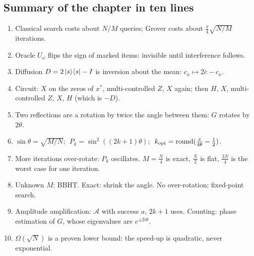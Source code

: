 \documentclass[11pt,a4paper,openany]{book}
\newcommand{\kopt}{k_{\rm opt}}
\newcommand{\xs}{x^\ast}
\newcommand{\proj}[1]{\ket{#1}\!\bra{#1}}
\begin{document}
\subsection*{Summary of the chapter in ten lines}
\begin{enumerate}[itemsep=1pt]
\item Classical search costs about $N/M$ queries; Grover costs about $\frac\pi4\sqrt{N/M}$ iterations.
\item Oracle $U_\omega$ flips the sign of marked items: invisible until interference follows.
\item Diffusion $D = 2\proj{s} - I$ is inversion about the mean: $c_x \mapsto 2\bar c - c_x$.
\item Circuit: $X$ on the zeros of $\xs$, multi-controlled $Z$, $X$ again; then $H$, $X$, multi-controlled $Z$, $X$, $H$ (which is $-D$).
\item Two reflections are a rotation by twice the angle between them: $G$ rotates by $2\theta$.
\item $\sin\theta = \sqrt{M/N}$; $\;P_k = \sin^2((2k+1)\theta)$; $\;\kopt = \operatorname{round}(\frac{\pi}{4\theta} - \frac12)$.
\item More iterations over-rotate: $P_k$ oscillates. $M = \frac N4$ is exact, $\frac N2$ is flat, $\frac{3N}{4}$ is the worst case for one iteration.
\item Unknown $M$: BBHT. Exact: shrink the angle. No over-rotation: fixed-point search.
\item Amplitude amplification: $\mathcal{A}$ with success $a$, $2k + 1$ uses. Counting: phase estimation of $G$, whose eigenvalues are $e^{\pm2i\theta}$.
\item $\Omega(\sqrt N)$ is a proven lower bound: the speed-up is quadratic, never exponential.
\end{enumerate}
\end{document}
